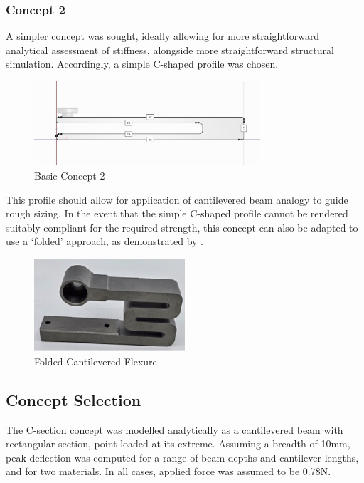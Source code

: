 \documentclass[10pt]{article}
\begin{document}
\subsubsection{Concept 2}
A simpler concept was sought, ideally allowing for more straightforward analytical assessment of
stiffness, alongside more straightforward structural simulation. Accordingly, a simple C-shaped
profile was chosen.

\begin{figure}[H]
	\centering
	\includegraphics[width=0.75\textwidth]{./assets/06-concept-02.png}
	\caption{Basic Concept 2}
	\label{fig:concept-02}
\end{figure}

This profile should allow for application of cantilevered beam analogy to guide rough sizing. In
the event that the simple C-shaped profile cannot be rendered suitably compliant for the required
strength, this concept can also be adapted to use a `folded' approach, as demonstrated by
\cite{carson2024}. %

\begin{figure}[H]
	\centering
	\includegraphics[width=0.5\textwidth]{./assets/07-folded.png}
	\caption{Folded Cantilevered Flexure \cite{carson2024}} %
	\label{fig:folded-flexure}
\end{figure}

\subsection{Concept Selection} \label{sec:concept-selection}
The C-section concept was modelled analytically as a cantilevered beam with rectangular section,
point loaded at its extreme. Assuming a breadth of 10mm, peak deflection was computed for a range
of beam depths and cantilever lengths, and for two materials. In all cases, applied force was
assumed to be 0.78N.
\end{document}
